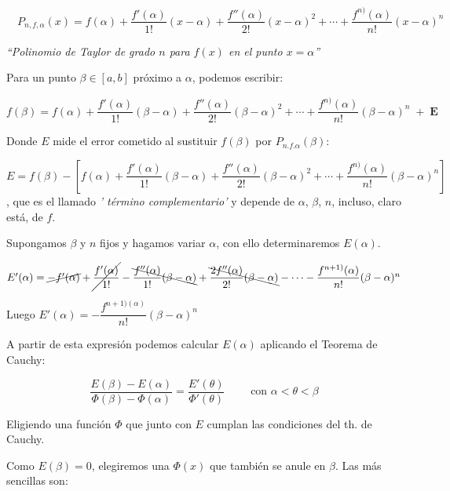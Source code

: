 \begin{cuadro-naranja}
		
	\begin{equation*}
		\label{Taylor}
		\boxed{ \quad P_{n,f,\alpha}(x)=f(\alpha)+\dfrac {f'(\alpha)}{1!} (x-\alpha)+\dfrac {f''(\alpha)}{2!} (x-\alpha)^2+\cdots +\dfrac {f^{n)}(\alpha)}{n!} (x-\alpha)^n \quad}
	\end{equation*}
	\centerline{\emph{``Polinomio de Taylor de grado $n$ para $f(x)$ en el punto $x=\alpha$''}}
\end{cuadro-naranja}
	
	Para un punto $\beta \in [a,b]$ próximo a $\alpha$, podemos escribir:
	
	$ f(\beta)=f(\alpha)+\dfrac {f'(\alpha)}{1!} (\beta-\alpha)+\dfrac {f''(\alpha)}{2!} (\beta-\alpha)^2+\cdots +\dfrac {f^{n)}(\alpha)}{n!} (\beta-\alpha)^n \; + \; \textbf{E}$
	
	Donde $E$ mide el error cometido al sustituir $f(\beta)$ por $P_{n.f.\alpha}(\beta)$:
	
	$E=f(\beta)- \left[ f(\alpha)+\dfrac {f'(\alpha)}{1!} (\beta-\alpha)+\dfrac {f''(\alpha)}{2!} (\beta-\alpha)^2+\cdots +\dfrac {f^{n)}(\alpha)}{n!} (\beta-\alpha)^n   \right]$, que es el llamado \emph{' término complementario'} y depende de $\alpha$, $\beta$, $n$, incluso, claro está, de $f$.
	
	Supongamos $\beta$ y $n$ fijos y hagamos variar $\alpha$, con ello determinaremos $E(\alpha)$.
	
	$E'(\alpha)=\cancel{-f'(\alpha)}+\cancel{\dfrac{f'(\alpha)}{1!}}-\bcancel{\dfrac {f''(\alpha)}{1!}(\beta-\alpha)} +\bcancel{\dfrac {2f''(\alpha)}{2!}(\beta-\alpha)}-\cdots - \dfrac {f^{n+1)}(\alpha)}{n!}(\beta-\alpha)^n$
	
	
	Luego  $E'(\alpha)=-\dfrac {f^{n+1)(\alpha)}}{n!}(\beta-\alpha)^n$
	
	A partir de esta expresión podemos calcular $E(\alpha)$ aplicando el Teorema de Cauchy:
	
	\begin{equation*}
		\dfrac {E(\beta)-E(\alpha)}{\Phi(\beta)-\Phi(\alpha)}=\dfrac {E'(\theta)}{\Phi'(\theta)} \qquad \mbox{ con } \alpha<\theta<\beta
	\end{equation*}
	
	Eligiendo una función $\Phi$ que junto con $E$ cumplan las condiciones del th. de Cauchy.
	
	Como $E(\beta)=0$, elegiremos una $\Phi(x)$ que también se anule en $\beta$. Las más sencillas son: 
	

